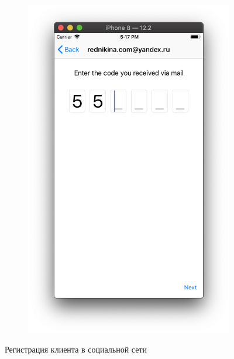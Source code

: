\documentclass[a4paper,12pt]{article}
\begin{document}
\begin{figure}[h!]
\begin{subfigure}[b]{0.3\linewidth}
			\includegraphics[width=\linewidth]{../includes/pmi/code.png}
		\end{subfigure}
		\caption{\label{pic: register}Регистрация клиента в социальной сети}
	\end{figure}
\end{document}
